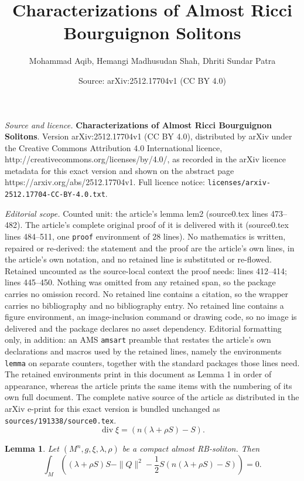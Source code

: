 \documentclass[10pt,a4paper]{amsart}
\title{\textbf{Characterizations of Almost Ricci Bourguignon Solitons}}
\author{Mohammad Aqib, Hemangi Madhusudan Shah, Dhriti Sundar Patra}
\date{Source: arXiv:2512.17704v1 (CC BY 4.0)}
\newtheorem{lemma}{Lemma}
\begin{document}
\maketitle

\noindent\emph{Source and licence.} \textbf{Characterizations of Almost Ricci Bourguignon Solitons}. Version arXiv:2512.17704v1 (CC BY 4.0), distributed by arXiv under the Creative Commons Attribution 4.0 International licence, http://creativecommons.org/licenses/by/4.0/, as recorded in the arXiv licence metadata for this exact version and shown on the abstract page https://arxiv.org/abs/2512.17704v1. Full licence notice: \texttt{licenses/arxiv-2512.17704-CC-BY-4.0.txt}.\par\smallskip

\noindent\textit{Editorial scope.} Counted unit: the article's lemma lem2 (source0.tex lines 473--482). The article's complete original proof of it is delivered with it (source0.tex lines 484--511, one \texttt{proof} environment of 28 lines). No mathematics is written, repaired or re-derived: the statement and the proof are the article's own lines, in the article's own notation, and no retained line is substituted or re-flowed.  Retained uncounted as the source-local context the proof needs: lines 412--414; lines 445--450.  Nothing was omitted from any retained span, so the package carries no omission record.  No retained line contains a citation, so the wrapper carries no bibliography and no bibliography entry.  No retained line contains a figure environment, an image-inclusion command or drawing code, so no image is delivered and the package declares no asset dependency.  Editorial formatting only, in addition: an AMS \texttt{amsart} preamble that restates the article's own declarations and macros used by the retained lines, namely the environments \texttt{lemma} on separate counters, together with the standard packages those lines need.  The retained environments print in this document as Lemma 1 in order of appearance, whereas the article prints the same items with the numbering of its own full document.  The complete native source of the article as distributed in the arXiv e-print for this exact version is bundled unchanged as \texttt{sources/191338/source0.tex}.
\begin{equation}\label{div}
    \operatorname{div} \xi=(n (\lambda +\rho S)-S).
\end{equation}

\begin{lemma}\label{lem1}
    Let $(M^n, g, \xi, \lambda,\rho)$ be a compact almost RB-soliton. Then
\begin{equation}\label{e1}
\int_{M}\left((\lambda+\rho S)S -\|Q\|^{2}-\frac{1}{2} S(n (\lambda +\rho S)-S)\right)=0.
\end{equation}
\end{lemma}
\end{document}
